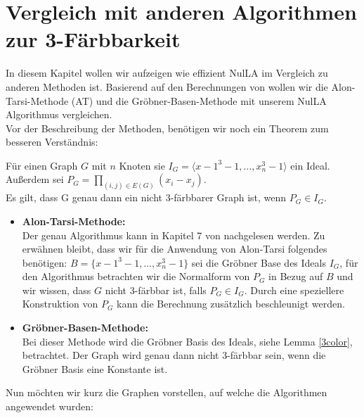 \section{Vergleich mit anderen Algorithmen zur 3-Färbbarkeit}

In diesem Kapitel wollen wir aufzeigen wie effizient NulLA im Vergleich zu anderen Methoden ist. Basierend auf den Berechnungen von \cite{Loera2011} wollen wir die Alon-Tarsi-Methode (AT) und die Gröbner-Basen-Methode mit unserem NulLA Algorithmus vergleichen.\\

\noindent Vor der Beschreibung der Methoden, benötigen wir noch ein Theorem zum besseren Verständnis:

\begin{theorem}
Für einen Graph $G$ mit $n$ Knoten sie $I_G = \langle x-1^3-1,\ldots, x_n^3-1 \rangle$ ein Ideal. Außerdem sei $P_G = \prod_{(i,j) \in E(G)} (x_i-x_j)$.\\
Es gilt, dass G genau dann ein nicht 3-färbbarer Graph ist, wenn $P_G \in I_G$.
\end{theorem}

\begin{itemize}
\item \textbf{Alon-Tarsi-Methode: }\\
Der genau Algorithmus kann in Kapitel 7 von \cite{Alon1999} nachgelesen werden. Zu erwähnen bleibt, dass wir für die Anwendung von Alon-Tarsi folgendes  benötigen: $B = \{x-1^3-1,\ldots, x_n^3-1\}$ sei die Gröbner Base des Ideals $I_G$, für den Algorithmus betrachten wir die Normalform von $P_G$ in Bezug auf $B$ und wir wissen, dass $G$ nicht 3-färbbar ist, falls $P_G \in I_G$. Durch eine speziellere Konstruktion von $P_G$ kann die Berechnung zusätzlich beschleunigt werden.
\item \textbf{Gröbner-Basen-Methode: }\\
Bei dieser Methode wird die Gröbner Basis des Ideals, siehe Lemma \ref{3color}, betrachtet. Der Graph wird genau dann nicht 3-färbbar sein, wenn die Gröbner Basis eine Konstante ist.
\end{itemize}

Nun möchten wir kurz die Graphen vorstellen, auf welche die Algorithmen angewendet wurden:

